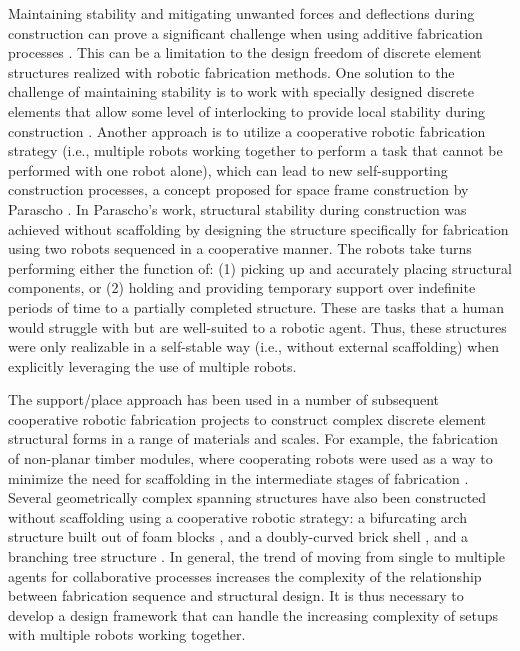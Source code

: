     Maintaining stability and mitigating unwanted forces and deflections during construction can prove a significant challenge when using additive fabrication processes \citep{bruun_three_2021, carneau_additive_2020, motamedi_supportless_2019}. This can be a limitation to the design freedom of discrete element structures realized with robotic fabrication methods. One solution to the challenge of maintaining stability is to work with specially designed discrete elements that allow some level of interlocking to provide local stability during construction \citep{latteur_droxel_2022,goessens_feasibility_2018}. Another approach is to utilize a cooperative robotic fabrication strategy (i.e., multiple robots working together to perform a task that cannot be performed with one robot alone), which can lead to new self-supporting construction processes, a concept proposed for space frame construction by Parascho \citep{parascho_cooperative_2017, parascho_computational_2018, parascho_cooperative_2019}. In Parascho's work, structural stability during construction was achieved without scaffolding by designing the structure specifically for fabrication using two robots sequenced in a cooperative manner. The robots take turns performing either the function of: (1) picking up and accurately placing structural components, or (2) holding and providing temporary support over indefinite periods of time to a partially completed structure. These are tasks that a human would struggle with but are well-suited to a robotic agent. Thus, these structures  were only realizable in a self-stable way (i.e., without external scaffolding) when explicitly leveraging the use of multiple robots.

    The support/place approach has been used in a number of subsequent cooperative robotic fabrication projects to construct complex discrete element structural forms in a range of materials and scales. For example, the fabrication of non-planar timber modules, where cooperating robots were used as a way to minimize the need for scaffolding in the intermediate stages of fabrication \citep{thoma_robotic_2018}. Several geometrically complex spanning structures have also been constructed without scaffolding using a cooperative robotic strategy: a bifurcating arch structure built out of foam blocks \citep{wu_robotic_2018}, and a doubly-curved brick shell \citep{parascho_robotic_2020, parascho_lightvault_2021, han_concept_2020}, and a branching tree structure \citep{bruun_humanrobot_2020}. In general, the trend of moving from single to multiple agents for collaborative processes increases the complexity of the relationship between fabrication sequence and structural design. It is thus necessary to develop a design framework that can handle the increasing complexity of setups with multiple robots working together.   
    
